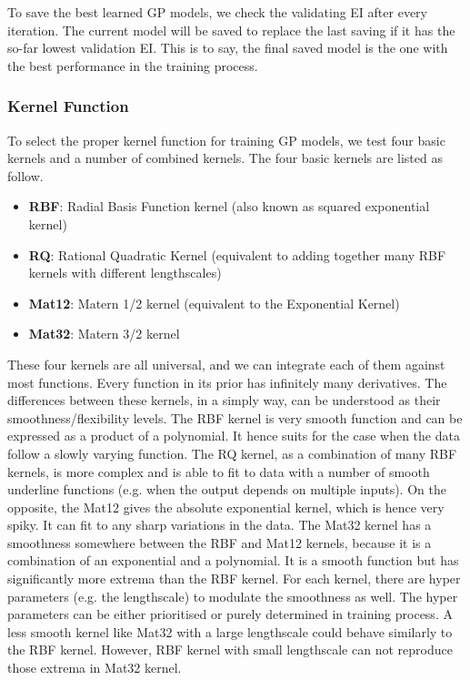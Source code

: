 To save the best learned GP models, we check the validating EI after every iteration. The current model will be saved to replace the last saving if it has the so-far lowest validation EI. This is to say, the final saved model is the one with the best performance in the training process.

\subsubsection{Kernel Function}\label{sec:kernel}

To select the proper kernel function for training GP models, we test four basic kernels and a number of combined kernels. 
%
The four basic kernels are listed as follow. 
\begin{itemize}
\item {\bf RBF}: Radial Basis Function kernel (also known as squared exponential kernel)
\item {\bf RQ}: Rational Quadratic Kernel (equivalent to adding together many RBF kernels with different lengthscales)
\item {\bf Mat12}: Matern 1/2 kernel (equivalent to the Exponential Kernel)
\item {\bf Mat32}: Matern 3/2 kernel 
\end{itemize}
These four kernels are all universal, and we can integrate each of them against most functions. Every function in its prior has infinitely many derivatives. The differences between these kernels, in a simply way, can be understood as their smoothness/flexibility levels. The RBF kernel is very smooth function and can be expressed as a product of a polynomial. It hence suits for the case when the data follow a slowly varying function. The RQ kernel, as a combination of many RBF kernels, is more complex and is able to fit to data with a number of smooth underline functions (e.g. when the output depends on multiple inputs). On the opposite, the Mat12 gives the absolute exponential kernel, which is hence very spiky. It can fit to any sharp variations in the data. The Mat32 kernel has a smoothness somewhere between the RBF and Mat12 kernels, because it is a combination of an exponential and a polynomial. It is a smooth function but has significantly more extrema than the RBF kernel. For each kernel, there are hyper parameters (e.g. the lengthscale) to modulate the smoothness as well. The hyper parameters can be either prioritised or purely determined in training process. A less smooth kernel like Mat32 with a large lengthscale could behave similarly to the RBF kernel. However, RBF kernel with small lengthscale can not reproduce those extrema in Mat32 kernel.
